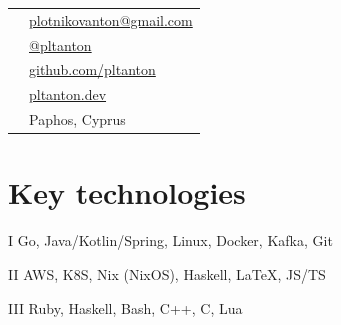 \documentclass{cv}
\begin{document}
\noindent
\begin{minipage}{5cm}
\end{minipage}
\begin{minipage}{\textwidth - 6cm}

	\begin{center}
		\begin{tabular}{cl}
			\faEnvelope      & \href{mailto:plotnikovanton@gmail.com}{plotnikovanton@gmail.com} \\
			\faTelegramPlane & \href{https://t.me/pltanton}{@pltanton}                          \\
			\faGithub*       & \href{https://github.com/pltanton}{github.com/pltanton}          \\
			\faGlobe         & \href{https://pltanton.dev}{pltanton.dev}                        \\
			\faMapPin        & Paphos, Cyprus
		\end{tabular}
	\end{center}
\end{minipage}
\vspace{2em}


\section{Key technologies}

\begin{cvblock}{I}
	Go, Java/Kotlin/Spring, Linux, Docker, Kafka, Git
\end{cvblock}

\begin{cvblock}{II}
	AWS, K8S, Nix (NixOS), Haskell, \LaTeX, JS/TS
\end{cvblock}

\begin{cvblock}{III}
	Ruby, Haskell, Bash, C++, C, Lua
\end{cvblock}
\end{document}
